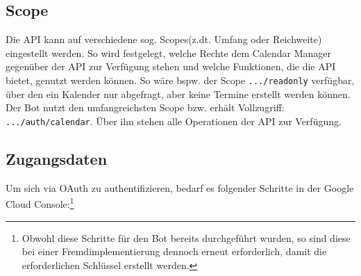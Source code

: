         \subsection{Scope}
            Die API kann auf verschiedene sog. \glq Scopes\grq (z.dt. Umfang oder Reichweite) eingestellt werden. So wird festgelegt, welche Rechte dem Calendar Manager gegenüber der API zur Verfügung stehen und welche Funktionen, die die API bietet, genutzt werden können. So wäre bspw. der Scope \verb|.../readonly| verfügbar, über den ein Kalender nur abgefragt, aber keine Termine erstellt werden können. Der Bot nutzt den umfangreichsten Scope bzw. erhält Vollzugriff: \verb|.../auth/calendar|. Über ihn stehen alle Operationen der API zur Verfügung.
        
        \subsection{Zugangsdaten}
            Um sich via OAuth zu authentifizieren, bedarf es folgender Schritte in der Google Cloud Console:\footnote{Obwohl diese Schritte für den Bot bereits durchgeführt wurden, so sind diese bei einer Fremdimplementierung dennoch erneut erforderlich, damit die erforderlichen Schlüssel erstellt werden.}
        
